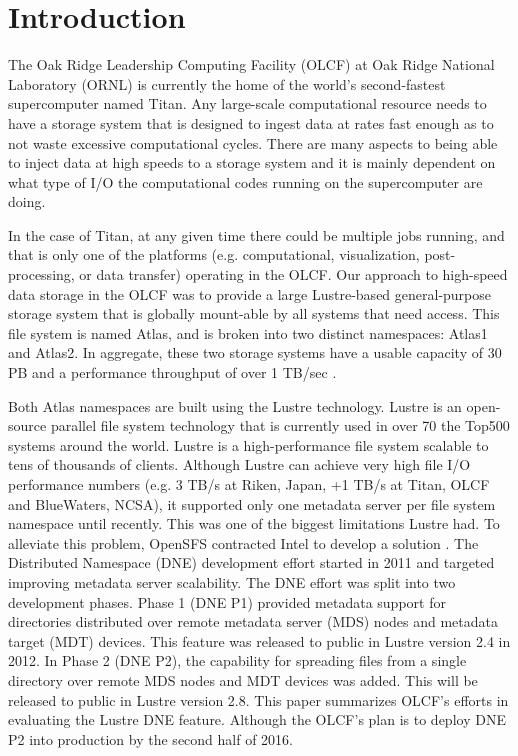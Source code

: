 \documentclass[conference,compsoc]{IEEEtran}
\begin{document}
%
\IEEEpeerreviewmaketitle


\section{Introduction}

The Oak Ridge Leadership Computing Facility (OLCF) at 
Oak Ridge National Laboratory (ORNL) is currently the home of the world's
second-fastest supercomputer named Titan. Any large-scale computational
resource needs to have a storage system that is designed to ingest data at
rates fast enough as to not waste excessive computational cycles. There are
many aspects to being able to inject data at high speeds to a storage system
and it is mainly dependent on what type of I/O the computational codes running
on the supercomputer are doing. 

In the case of Titan, at any given time there could be multiple jobs running,
and that is only one of the platforms (e.g. computational, visualization,
post-processing, or data transfer) operating in the OLCF. Our approach to
high-speed data storage in the OLCF was to provide a large Lustre-based
general-purpose storage system that is globally mount-able by all systems that
need access. This file system is named Atlas, and is broken into two distinct
namespaces: Atlas1 and Atlas2. In aggregate, these two storage systems have a
usable capacity of 30 PB and a performance throughput of over 1 TB/sec \cite{sarp-cug}. 

Both Atlas namespaces are built using the Lustre technology. Lustre is an
open-source parallel file system technology that is currently used in over 70%
the Top500 systems around the world. Lustre is a high-performance file system
scalable to tens of thousands of clients. Although Lustre can achieve very high
file I/O performance numbers (e.g. 3 TB/s at Riken, Japan, +1 TB/s at Titan,
OLCF and BlueWaters, NCSA), it supported only one metadata server per file
system namespace until recently. This was one of the biggest limitations Lustre
had. To alleviate this problem, OpenSFS contracted Intel to develop a solution
\cite{dne-contract}.  The Distributed Namespace (DNE) development effort
started in 2011 and targeted improving metadata server scalability.  The
DNE effort was split into two development phases.  Phase 1 (DNE P1) provided
metadata support for directories distributed over remote metadata server (MDS)
nodes and metadata target (MDT) devices. This feature was released to public in
Lustre version 2.4 in 2012. In Phase 2 (DNE P2), the capability for spreading files
from a single directory over remote MDS nodes and MDT devices was added. This
will be released to public in Lustre version 2.8.  This paper summarizes
OLCF's efforts in evaluating the Lustre DNE feature. Although the OLCF's plan is to deploy
DNE P2 into production by the second half of 2016.
\end{document}
